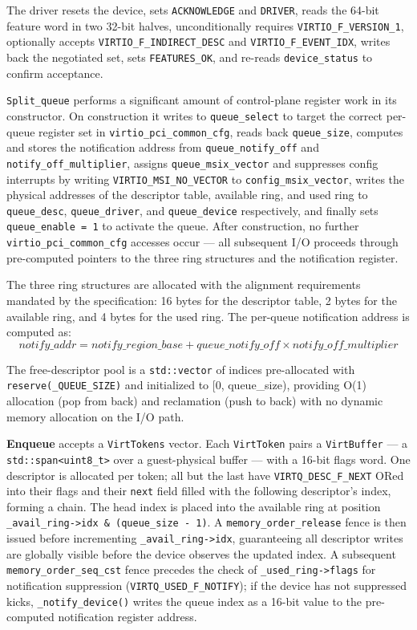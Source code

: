 \documentclass[12pt, a4paper, oneside]{report}
\begin{document}
The driver resets the device, sets \texttt{ACKNOWLEDGE} and \texttt{DRIVER},
reads the 64-bit feature word in two 32-bit halves, unconditionally requires
\texttt{VIRTIO\_F\_VERSION\_1}, optionally accepts
\texttt{VIRTIO\_F\_INDIRECT\_DESC} and \texttt{VIRTIO\_F\_EVENT\_IDX}, writes
back the negotiated set, sets \texttt{FEATURES\_OK}, and re-reads
\texttt{device\_status} to confirm acceptance.

\texttt{Split\_queue} performs a significant amount of control-plane register
work in its constructor.  On construction it writes to \texttt{queue\_select} to
target the correct per-queue register set in \texttt{virtio\_pci\_common\_cfg},
reads back \texttt{queue\_size}, computes and stores the notification address
from \texttt{queue\_notify\_off} and \texttt{notify\_off\_multiplier}, assigns
\texttt{queue\_msix\_vector} and suppresses config interrupts by writing
\texttt{VIRTIO\_MSI\_NO\_VECTOR} to \texttt{config\_msix\_vector}, writes the
physical addresses of the descriptor table, available ring, and used ring to
\texttt{queue\_desc}, \texttt{queue\_driver}, and \texttt{queue\_device}
respectively, and finally sets \texttt{queue\_enable = 1} to activate the queue.
After construction, no further \texttt{virtio\_pci\_common\_cfg} accesses occur
--- all subsequent I/O proceeds through pre-computed pointers to the three ring
structures and the notification register.

The three ring structures are allocated with the alignment requirements mandated
by the specification: 16 bytes for the descriptor table, 2 bytes for the
available ring, and 4 bytes for the used ring.  The per-queue notification
address is computed as:
\[
  \textit{notify\_addr} = \textit{notify\_region\_base}
    + \textit{queue\_notify\_off} \times \textit{notify\_off\_multiplier}
\]

The free-descriptor pool is a \texttt{std::vector} of indices pre-allocated with
\texttt{reserve(\_QUEUE\_SIZE)} and initialized to [0, queue\_size), providing
O(1) allocation (pop from back) and reclamation (push to back) with no dynamic
memory allocation on the I/O path.

\textbf{Enqueue} accepts a \texttt{VirtTokens} vector.  Each \texttt{VirtToken}
pairs a \texttt{VirtBuffer} --- a \texttt{std::span<uint8\_t>} over a
guest-physical buffer --- with a 16-bit flags word.  One descriptor is allocated
per token; all but the last have \texttt{VIRTQ\_DESC\_F\_NEXT} ORed into their
flags and their \texttt{next} field filled with the following descriptor's index,
forming a chain.  The head index is placed into the available ring at position
\texttt{\_avail\_ring->idx \& (queue\_size - 1)}.  A
\texttt{memory\_order\_release} fence is then issued before incrementing
\texttt{\_avail\_ring->idx}, guaranteeing all descriptor writes are globally
visible before the device observes the updated index.  A subsequent
\texttt{memory\_order\_seq\_cst} fence precedes the check of
\texttt{\_used\_ring->flags} for notification suppression
(\texttt{VIRTQ\_USED\_F\_NOTIFY}); if the device has not suppressed kicks,
\texttt{\_notify\_device()} writes the queue index as a 16-bit value to the
pre-computed notification register address.
\end{document}
